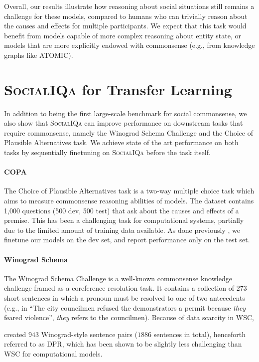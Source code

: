Overall, our results illustrate how reasoning about social situations still remains a challenge for these models, compared to humans who can trivially reason about the causes and effects for multiple participants. We expect that this task would benefit from models capable of more complex reasoning about entity state, or models that are more explicitly endowed with commonsense (e.g., from knowledge graphs like ATOMIC).

\section{\textsc{SocialIQa} for Transfer Learning} In addition to being the first large-scale benchmark for social commonsense, we also show that \textsc{SocialIQa} can improve performance on downstream tasks that require commonsense, namely the Winograd Schema Challenge and the Choice of Plausible Alternatives task. We achieve state of the art performance on both tasks by sequentially finetuning on \textsc{SocialIQa} before the task itself.

\paragraph{COPA}
The Choice of Plausible Alternatives task \citep[COPA;][]{Roemmele2011ChoiceOP} is a two-way multiple choice task which aims to measure commonsense reasoning abilities of models. The dataset contains 1,000 questions (500 dev, 500 test) that ask about the causes and effects of a premise. This has been a challenging task for computational systems, partially due to the limited amount of training data available. As done previously \citep{copacetic,luo2016commonsense}, we finetune our models on the dev set, and report performance only on the test set.

\paragraph{Winograd Schema}

The Winograd Schema Challenge \citep[WSC;][]{Levesque2011TheWS} is a well-known commonsense knowledge challenge framed as a coreference resolution task. It contains a collection of $273$ short sentences in which a pronoun must be resolved to one of two antecedents (e.g., in ``The city councilmen refused the demonstrators a permit because \textit{they} feared violence'', \textit{they} refers to the councilmen). Because of data scarcity in WSC,

\citet{Rahman2012DPR} created $943$ Winograd-style sentence pairs ($1886$ sentences in total), henceforth referred to as DPR, which has been shown to be slightly less challenging than WSC for computational models. 

